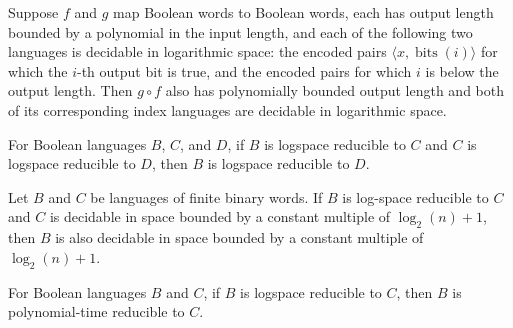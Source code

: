 \begin{theorem}
\label{Complexity.ImplicitlyLogspaceComputable.comp}
\leanok
{}
Suppose $f$ and $g$ map Boolean words to Boolean words, each has output length bounded
by a polynomial in the input length, and each of the following two languages is
decidable in logarithmic space: the encoded pairs $\langle
x,\operatorname{bits}(i)\rangle$ for which the $i$-th output bit is true, and the
encoded pairs for which $i$ is below the output length. Then $g\circ f$ also has
polynomially bounded output length and both of its corresponding index languages are
decidable in logarithmic space.
\end{theorem}

\begin{theorem}
\label{Complexity.LogspaceReducible.trans}
\leanok
{}
For Boolean languages $B$, $C$, and $D$, if $B$ is logspace reducible to $C$ and $C$ is
logspace reducible to $D$, then $B$ is logspace reducible to $D$.
\end{theorem}

\begin{theorem}
\label{Complexity.mem_LOGSPACE_of_logspaceReducible}
\leanok
{}
Let $B$ and $C$ be languages of finite binary words. If $B$ is log-space reducible to
$C$ and $C$ is decidable in space bounded by a constant multiple of $\log_2(n)+1$, then
$B$ is also decidable in space bounded by a constant multiple of $\log_2(n)+1$.
\end{theorem}

\begin{theorem}
\label{Complexity.LogspaceReducible.polyTimeReducible}
\leanok
{}
For Boolean languages $B$ and $C$, if $B$ is logspace reducible to $C$, then $B$ is
polynomial-time reducible to $C$.
\end{theorem}

